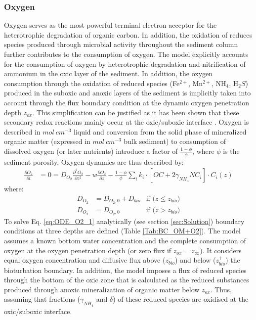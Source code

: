 \documentclass[gmd, manuscript]{copernicus}
\begin{document}
\subsubsection{Oxygen}
Oxygen serves as the most powerful terminal electron acceptor for the heterotrophic degradation of organic carbon. In addition, the oxidation of reduces species produced through microbial activity throughout the 
sediment column further contributes to the consumption of oxygen. The model explicitly accounts for the consumption of oxygen by heterotrophic degradation and nitrification of ammonium in the oxic layer of the sediment. 
In addition, the oxygen consumption through the oxidation of reduced species (Fe$^{2+}$, Mn$^{2+}$, NH$_4$, H$_2S$) produced in the suboxic and anoxic layers of the sediment is implicitly taken into account through the flux 
boundary condition at the dynamic oxygen penetration depth $z_{ox}$. This simplification can be justified as it has been shown that these secondary redox reactions mainly occur at the oxic/suboxic interface \citep{soetaert_model_1996}.  
Oxygen is described in $mol\ cm^{-3}$ liquid and conversion from the solid phase of mineralized organic matter (expressed in $mol\ cm^{-3}$ bulk sediment) to consumption of dissolved oxygen (or later nutrients) introduce 
a factor of $\frac{1-\phi}{\phi}$, where $\phi$ is the sediment porosity. Oxygen dynamics are thus described by:
\begin{align} 
 \frac{\partial O_2}{\partial t} &= 0= D_{O_2}\frac{\partial^2 O_2 }{\partial z^2} - w\frac{\partial O_2}{\partial z} - \frac{1-\phi}{\phi}\sum_i k_i \cdot [ OC + 2 \gamma_{NH_4} NC_i ]\cdot C_{i}(z) \label{eq:ODE_O2_1}
\end{align}
where:
\begin{align}
 D_{O_2}&=D_{O_2, 0}+D_{bio}  &\text{if ($z\leq z_{bio}$)}\\
 D_{O_2}&=D_{O_2, 0}                &\text{if ($z > z_{bio}$)} 
\end{align}  
To solve Eq. \ref{eq:ODE_O2_1} analytically (see section \ref{sec:Solution}) boundary conditions at three depths are defined (Table \ref{Tab:BC_OM+O2}). 
The model assumes a known bottom water concentration and the complete consumption of oxygen at the oxygen penetration depth (or zero flux if $z_{ox}=z_\infty$). 
It considers equal oxygen concentration and diffusive flux above ($z_{bio}^-$) and 
below ($z_{bio}^+$) the bioturbation boundary. In addition, the model imposes a flux of reduced species through the bottom of the oxic zone that is calculated as the reduced substances produced through anoxic mineralization 
of organic matter below $z_{ox}$. Thus, assuming that fractions ($\gamma_{NH_4}$ and $\delta$) of these reduced species are oxidised at the oxic/suboxic interface.
\end{document}
